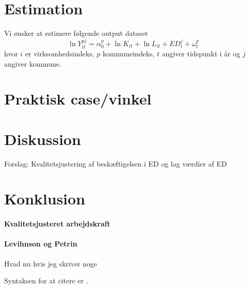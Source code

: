 \documentclass[a4paper, 12pt, titlepage]{article}
\begin{document}
\section{Estimation}
Vi ønsker at estimere følgende output dataset
\begin{equation}
	\ln Y_{it}^{pj} = \alpha^p_0 + \ln K_{it} + \ln L_{it} + ED^j_{t} + \omega^p_{t}
\end{equation}
hvor $i$ er virksomhedsindeks, $p$ kommuneindeks, $t$ angiver tidspunkt i år og $j$ angiver kommune. 
\section{Praktisk case/vinkel}
\section{Diskussion}
Forslag: Kvalitetsjustering af beskæftigelsen i ED og lag værdier af ED 
\section{Konklusion}



\paragraph{Kvalitetsjusteret arbejdskraft}



\paragraph{Levihnson og Petrin}
Hvad nu hvis jeg skriver noge

Syntaksen for at citere er \cite[pp. 211ff.]{melo2009meta}. 






\end{document}
